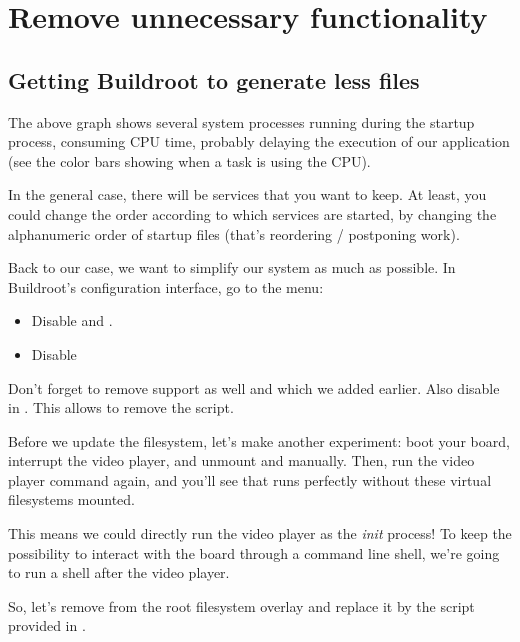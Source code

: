 \section{Remove unnecessary functionality}

\subsection{Getting Buildroot to generate less files}

The above graph shows several system processes running
during the startup process, consuming CPU time, probably delaying
the execution of our application (see the color bars showing when
a task is using the CPU).

In the general case, there will be services that you want to keep. At
least, you could change the order according to which services are
started, by changing the alphanumeric order of startup files (that's
reordering / postponing work).

Back to our case, we want to simplify our system as much as possible.
In Buildroot's configuration interface, go to the  menu:

\begin{itemize}
\item Disable  and
      .
\item Disable 
\end{itemize}

Don't forget to remove  support as well and
 which we added earlier.
Also disable  in .
This allows to remove the  script.

Before we update the filesystem, let's make another experiment: boot
your board, interrupt the video player, and unmount  and
 manually. Then, run the video player command again, and
you'll see that  runs perfectly without these virtual
filesystems mounted.

This means we could directly run the video player as the {\em init}
process! To keep the possibility to interact with the board through
a command line shell, we're going to run a shell after the video player.

So, let's remove  from the root
filesystem overlay and replace it by the  script
provided in .

